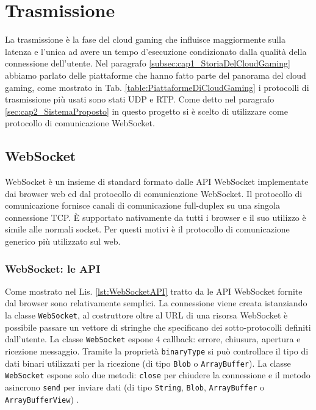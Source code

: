 \section{Trasmissione}
La trasmissione è la fase del cloud gaming che influisce maggiormente sulla latenza e l'unica ad avere un tempo d'esecuzione condizionato dalla qualità della connessione dell'utente. Nel paragrafo \ref{subsec:cap1_StoriaDelCloudGaming} abbiamo parlato delle piattaforme che hanno fatto parte del panorama del cloud gaming, come mostrato in Tab. \ref{table:PiattaformeDiCloudGaming} i protocolli di trasmissione più usati sono stati UDP e RTP. Come detto nel paragrafo \ref{sec:cap2_SistemaProposto} in questo progetto si è scelto di utilizzare come protocollo di comunicazione WebSocket.

\subsection{WebSocket}
WebSocket è un insieme di standard formato dalle API WebSocket implementate dai browser web ed dal protocollo di comunicazione WebSocket. Il protocollo di comunicazione fornisce canali di comunicazione full-duplex su una singola connessione TCP. È supportato nativamente da tutti i browser e il suo utilizzo è simile alle normali socket. Per questi motivi è il protocollo di comunicazione generico più utilizzato sul web.

\subsubsection{WebSocket: le API}
Come mostrato nel Lis. \ref{lst:WebSocketAPI} tratto da \parencite{High_Performance_Browser_Networking} le API WebSocket fornite dal browser sono relativamente semplici. La connessione viene creata istanziando la classe \verb|WebSocket|, al costruttore oltre al URL di una risorsa WebSocket è possibile passare un vettore di stringhe che specificano dei sotto-protocolli definiti dall'utente. La classe \verb|WebSocket| espone 4 callback: errore, chiusura, apertura e ricezione messaggio. Tramite la proprietà \verb|binaryType| si può controllare il tipo di dati binari utilizzati per la ricezione (di tipo \verb|Blob| o \verb|ArrayBuffer|). La classe \verb|WebSocket| espone solo due metodi: \verb|close| per chiudere la connessione e il metodo asincrono \verb|send| per inviare dati (di tipo \verb|String|, \verb|Blob|, \verb|ArrayBuffer| o \verb|ArrayBufferView|) \parencite{WebSocket_Web_APIs}.

